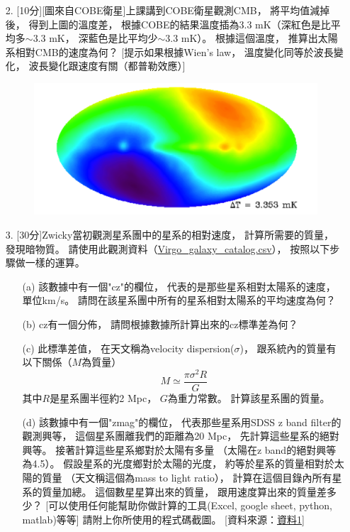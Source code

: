 \documentclass{article}
\theoremstyle{definition}
\begin{document}
\begin{enumerate}
	\item[2.] [10分][圖來自COBE衛星]上課講到COBE衛星觀測CMB，
		將平均值減掉後，
		得到上圖的溫度差，
		根據COBE的結果溫度插為3.3 mK（深紅色是比平均多$\sim 3.3$ mK，
		深藍色是比平均少$\sim 3.3$ mK）。
		根據這個溫度，
		推算出太陽系相對CMB的速度為何？
		[提示如果根據Wien's law，
		溫度變化同等於波長變化，
		波長變化跟速度有關（都普勒效應）]

		\begin{figure}[h]
			\centering
			\includegraphics[scale = 0.3]{hw2-2.png}
			\caption{}
			\label{fig2}
		\end{figure}

	\item[3.] [30分]Zwicky當初觀測星系團中的星系的相對速度，
		計算所需要的質量，
		發現暗物質。
		請使用此觀測資料（\href{https://www.dropbox.com/s/6z5jypo7tj2ulen/Virgo_galaxy_catalog.csv?dl=0}{Virgo\_galaxy\_catalog.csv}），
		按照以下步驟做一樣的運算。

		\begin{enumerate}
			\item[(a)] 該數據中有一個"cz"的欄位，
				代表的是那些星系相對太陽系的速度，
				單位km/s。
				請問在該星系團中所有的星系相對太陽系的平均速度為何？

			\item[(b)] cz有一個分佈，
				請問根據數據所計算出來的cz標準差為何？

			\item[(c)] 此標準差值，
				在天文稱為velocity dispersion($\sigma$)，
				跟系統內的質量有以下關係（$M$為質量）
				\[
					M \simeq \frac{\pi \sigma^2 R}{G}
				\]
				其中$R$是星系團半徑約2 Mpc，
				$G$為重力常數。
				計算該星系團的質量。

			\item[(d)] 該數據中有一個"zmag"的欄位，
				代表那些星系用SDSS z band filter的觀測興等，
				這個星系團離我們的距離為20 Mpc，
				先計算這些星系的絕對興等。
				接著計算這些星系鄉對於太陽有多量
				（太陽在z band的絕對興等為4.5）。
				假設星系的光度鄉對於太陽的光度，
				約等於星系的質量相對於太陽的質量
				（天文稱這個為mass to light ratio），
				計算在這個目錄內所有星系的質量加總。
				這個數星星算出來的質量，
				跟用速度算出來的質量差多少？
				[可以使用任何能幫助你做計算的工具(Excel, google sheet, python, matlab)等等]
				請附上你所使用的程式碼截圖。
				[資料來源：\href{https://ui.adsabs.harvard.edu/abs/2015yCat..22150022K/abstract}{資料1}]
		\end{enumerate}


\end{enumerate}
\end{document}
